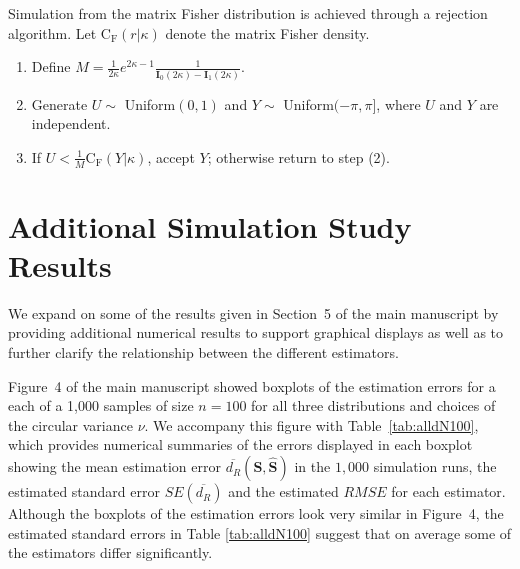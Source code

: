\documentclass[12pt]{article}
\newcommand{\Rdist}{{d_R}}
\begin{document}
Simulation from the matrix Fisher distribution is achieved through a rejection algorithm.  Let  $\mathrm{C_F}(r|\kappa)$ denote the matrix Fisher density.%

\begin{enumerate}
\item Define $M=\frac{1}{2\kappa}e^{2\kappa - 1}\frac{1}{\mathbf{I}_0(2\kappa)-\mathbf{I}_1(2\kappa)}.$
\item Generate $U\sim$ Uniform$(0,1)$ and $Y\sim$ Uniform$(-\pi,\pi]$, where $U$ and $Y$ are independent.
\item If $U<\frac{1}{M}\mathrm{C_F}(Y|\kappa)$, accept $Y$; otherwise return to step (2).
\end{enumerate}

%


\section{Additional Simulation Study Results}
\label{sec:appendix3}
We expand on some of the results given in Section~5 of the main manuscript by providing additional numerical results to support graphical displays as well as to further clarify the relationship between the different estimators.

Figure~4 of the main manuscript showed boxplots of the estimation errors for a each of a 1,000 samples of size $n=100$ for all three distributions and choices of the circular variance $\nu$.  We accompany this figure with Table~\ref{tab:alldN100}, which provides numerical summaries of the errors displayed in each boxplot showing the mean estimation error $\overline{\Rdist}(\bm{S}, \widehat{\bm{S}})$ in the $1,000$ simulation runs, the estimated standard error $SE(\overline{\Rdist})$ and the estimated $RMSE$ for each estimator.  Although the boxplots of the estimation errors look very similar in Figure~4, the estimated standard errors in Table \ref{tab:alldN100} suggest that on average some of the estimators differ significantly.  
\end{document}

